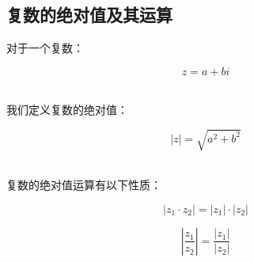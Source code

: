 \documentclass[UTF8]{ctexart}
\begin{document}
\newpage

\subsection{复数的绝对值及其运算}
    对于一个复数：
    \begin{large}
        \begin{equation*}
            z=a+bi
        \end{equation*}
    \end{large}\\
    我们定义复数的绝对值：
    \begin{large}
        \begin{equation*}
            |z|=\sqrt{a^2+b^2}
        \end{equation*}
    \end{large}\\
    复数的绝对值运算有以下性质：
    \begin{large}
        \begin{equation*}
            \left|z_1\cdot z_2\right|=|z_1|\cdot|z_2|
        \end{equation*}
    \end{large}
    \begin{large}
        \begin{equation*}
            \left|\frac{z_1}{z_2}\right|=\frac{|z_1|}{|z_2|}
        \end{equation*}
    \end{large}
\end{document}
